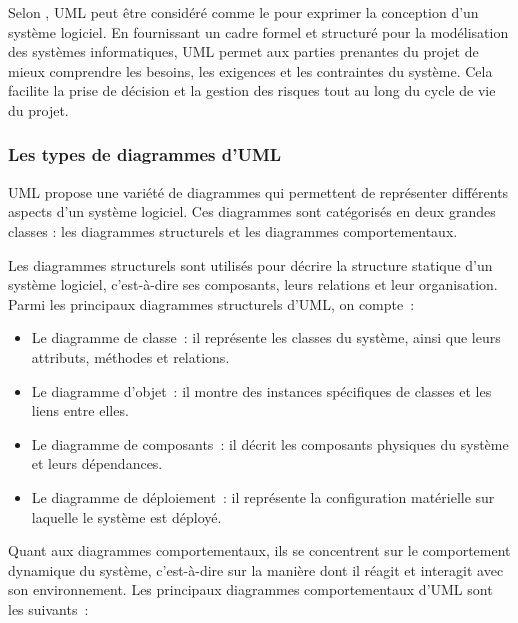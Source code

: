 Selon \textcite{fowler2003uml}, UML peut être considéré comme le
 pour exprimer la conception d’un système
logiciel. En fournissant un cadre formel et structuré pour la modélisation des
systèmes informatiques, UML permet aux parties prenantes du projet de mieux
comprendre les besoins, les exigences et les contraintes du système. Cela facilite
la prise de décision et la gestion des risques tout au long du cycle de vie du projet.

\subsubsection{Les types de diagrammes d'UML}
UML propose une variété de diagrammes qui permettent de représenter différents
aspects d'un système logiciel. Ces diagrammes sont catégorisés en deux grandes
classes : les diagrammes structurels et les diagrammes comportementaux.

Les diagrammes structurels sont utilisés pour décrire la structure statique
d’un système logiciel, c’est-à-dire ses composants, leurs relations et leur
organisation. Parmi les principaux diagrammes structurels d’UML, on compte :

\begin{itemize}

  \item Le diagramme de classe : il représente les classes du système, ainsi que leurs
    attributs, méthodes et relations.

  \item Le diagramme d’objet : il montre des instances spécifiques de classes
    et les liens entre elles.

  \item Le diagramme de composants : il décrit les composants physiques du
    système et leurs dépendances.

  \item Le diagramme de déploiement : il représente la configuration matérielle
    sur laquelle le système est déployé.

\end{itemize}


Quant aux diagrammes comportementaux, ils se concentrent sur le comportement
dynamique du système, c’est-à-dire sur la manière dont il réagit et interagit
avec son environnement. Les principaux diagrammes comportementaux d’UML sont
les suivants :


